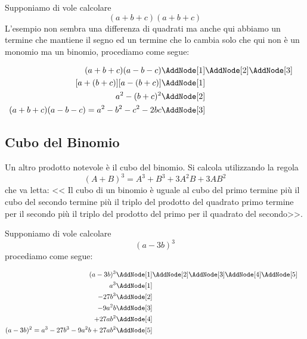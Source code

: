 \begin{esempio}
Supponiamo di vole calcolare \[(a+b+c)(a+b+c)\]
L'esempio non sembra una differenza di quadrati ma anche qui abbiamo un termine che mantiene il segno ed un termine che lo cambia solo che qui non è un monomio ma un binomio, procediamo come segue:
\begin{NodesList}
	\begin{align*}
		(a+b+c)(a-b-c)&\AddNode[1]\AddNode[2]\AddNode[3]\\
		[a+(b+c)][a-(b+c)]&\AddNode[1]&\\ 
		a^2-(b+c)^2&\AddNode[2]&\\
		(a+b+c)(a-b-c)=a^2-b^2-c^2-2bc&\AddNode[3]
	\end{align*}
\end{NodesList}
\end{esempio}
\subsection{Cubo del Binomio}
Un altro prodotto notevole è il cubo del binomio. Si calcola utilizzando la regola\[(A+B)^3=A^3+B^3+3A^2B+3AB^2\] che va letta: << Il cubo di un binomio è uguale al cubo del primo termine più il cubo del secondo termine più il triplo del prodotto del quadrato primo termine per il secondo  più il triplo del prodotto del primo per il quadrato del secondo>>. 
\begin{center}

\end{center}
\begin{esempio}
Supponiamo di vole calcolare \[(a-3b)^3\]
procediamo come segue:
\begin{NodesList}
	\begin{align*}
		(a-3b)^3&\AddNode[1]\AddNode[2]\AddNode[3]\AddNode[4]\AddNode[5]\\
		a^3&\AddNode[1]&\\ 
		-27b^3&\AddNode[2]&\\
		-9a^2b&\AddNode[3]\\
		+27ab^2&\AddNode[4]\\
		(a-3b)^2=a^3-27b^3-9a^2b+27ab^2&\AddNode[5]
	\end{align*}
\end{NodesList}
\end{esempio}

